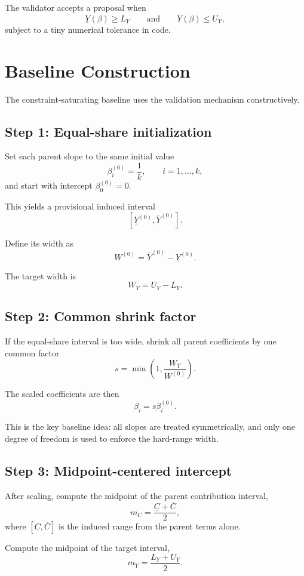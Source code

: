 \documentclass[11pt]{article}
\begin{document}
The validator accepts a proposal when
\[
\underline{Y}(\beta) \ge L_Y
\qquad \text{and} \qquad
\overline{Y}(\beta) \le U_Y,
\]
subject to a tiny numerical tolerance in code.

\section{Baseline Construction}

The constraint-saturating baseline uses the validation mechanism constructively.

\subsection{Step 1: Equal-share initialization}

Set each parent slope to the same initial value
\[
\beta_i^{(0)} = \frac{1}{k}, \qquad i=1,\dots,k,
\]
and start with intercept $\beta_0^{(0)} = 0$.

This yields a provisional induced interval
\[
[\underline{Y}^{(0)}, \overline{Y}^{(0)}].
\]

Define its width as
\[
W^{(0)} = \overline{Y}^{(0)} - \underline{Y}^{(0)}.
\]

The target width is
\[
W_Y = U_Y - L_Y.
\]

\subsection{Step 2: Common shrink factor}

If the equal-share interval is too wide, shrink all parent coefficients by one common factor
\[
s = \min\left(1, \frac{W_Y}{W^{(0)}}\right).
\]

The scaled coefficients are then
\[
\beta_i = s \beta_i^{(0)}.
\]

This is the key baseline idea: all slopes are treated symmetrically, and only one degree of freedom is used to enforce the hard-range width.

\subsection{Step 3: Midpoint-centered intercept}

After scaling, compute the midpoint of the parent contribution interval,
\[
m_C = \frac{\underline{C} + \overline{C}}{2},
\]
where $[\underline{C}, \overline{C}]$ is the induced range from the parent terms alone.

Compute the midpoint of the target interval,
\[
m_Y = \frac{L_Y + U_Y}{2}.
\]
\end{document}

